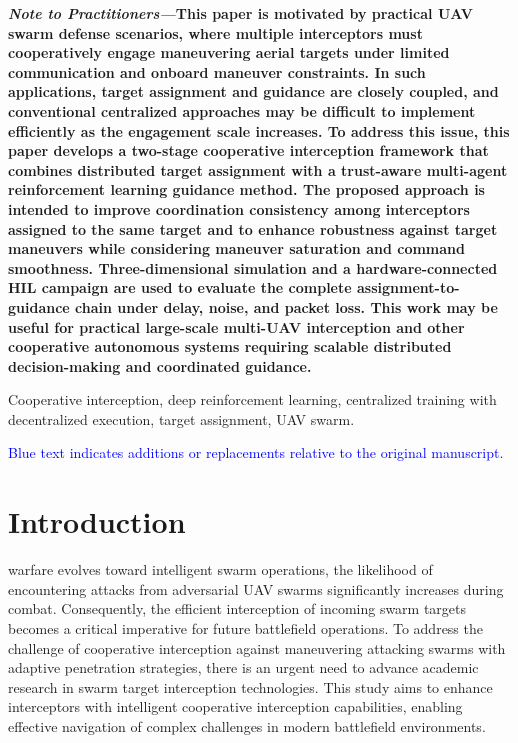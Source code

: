\documentclass[lettersize,journal]{IEEEtran}
\providecommand{\DIFadd}[1]{{\protect\color{blue} #1}} %
\providecommand{\DIFaddbegin}{} %
\providecommand{\DIFaddend}{} %
\begin{document}
{\linespread{0.9}\selectfont
\hspace*{0.0em}\textbf{\textit{Note to Practitioners—}}\textbf{This paper is motivated by practical UAV swarm defense scenarios, where multiple interceptors must cooperatively engage maneuvering aerial targets under limited communication and onboard maneuver constraints. In such applications, target assignment and guidance are closely coupled, and conventional centralized approaches may be difficult to implement efficiently as the engagement scale increases. To address this issue, this paper develops a two-stage cooperative interception framework that combines distributed target assignment with a trust-aware multi-agent reinforcement learning guidance method. The proposed approach is intended to improve coordination consistency among interceptors assigned to the same target and to enhance robustness against target maneuvers while considering maneuver saturation and command smoothness. \DIFaddbegin \DIFadd{Three-dimensional simulation and a hardware-connected HIL campaign are used to evaluate the complete assignment-to-guidance chain under delay, noise, and packet loss. }\DIFaddend This work may be useful for practical large-scale multi-UAV interception and other cooperative autonomous systems requiring scalable distributed decision-making and coordinated guidance.}\par\vspace{0.5\baselineskip}
}

\begin{IEEEkeywords}
Cooperative interception, deep reinforcement learning, centralized training with decentralized
execution, target assignment, UAV swarm.
\end{IEEEkeywords}

\begin{center}
\footnotesize\textcolor{blue}{Blue text indicates additions or replacements relative to the original manuscript.}
\end{center}

\section{Introduction}
\label{sec:introduction}
 warfare evolves toward intelligent swarm operations, the likelihood of
encountering attacks from adversarial UAV swarms significantly increases during combat.
Consequently, the efficient interception of incoming swarm targets becomes a critical
imperative for future battlefield operations.
To address the challenge of cooperative interception against maneuvering attacking swarms with
adaptive penetration strategies, there is an urgent need to advance academic research in swarm
target interception technologies.
This study aims to enhance interceptors with intelligent cooperative interception capabilities,
enabling effective navigation of complex challenges in modern battlefield environments.
\end{document}
